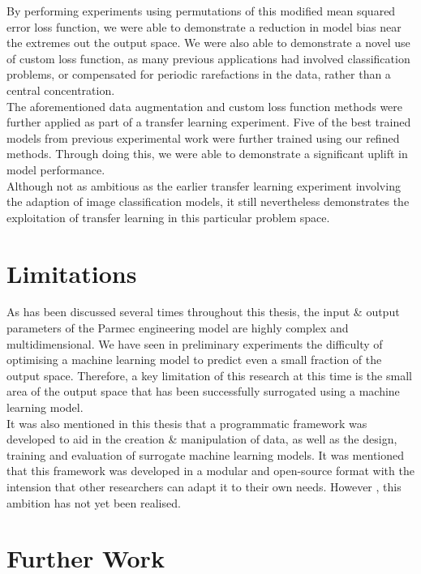 \noindent
By performing experiments using permutations of this modified mean squared error loss function, we were able to demonstrate a reduction in model bias near the extremes out the output space. We were also able to demonstrate a novel use of custom loss function, as many previous applications had involved classification problems, or compensated for periodic rarefactions in the data, rather than a central concentration. \\

\noindent
The aforementioned data augmentation and custom loss function methods were further applied as part of a transfer learning experiment. Five of the best trained models from previous experimental work were further trained using our refined methods. Through doing this, we were able to demonstrate a significant uplift in model performance. \\

\noindent
Although not as ambitious as the earlier transfer learning experiment involving the adaption of image classification models, it still nevertheless demonstrates the exploitation of transfer learning in this particular problem space. 
 
 \section{Limitations}
 
 As has been discussed several times throughout this thesis, the input \& output parameters of the Parmec engineering model are highly complex and multidimensional. We have seen in preliminary experiments the difficulty of optimising a machine learning model to predict even a small fraction of the output space. Therefore, a key limitation of this research at this time is the small area of the output space that has been successfully surrogated using a machine learning model. \\
 
 \noindent
 It was also mentioned in this thesis that a programmatic framework was developed to aid in the creation \& manipulation of data, as well as the design, training and evaluation of surrogate machine learning models. It was mentioned that this framework was developed in a modular and open-source  format with the intension that other researchers can adapt it to their own needs. However , this ambition has not yet been realised.

\section{Further Work}

